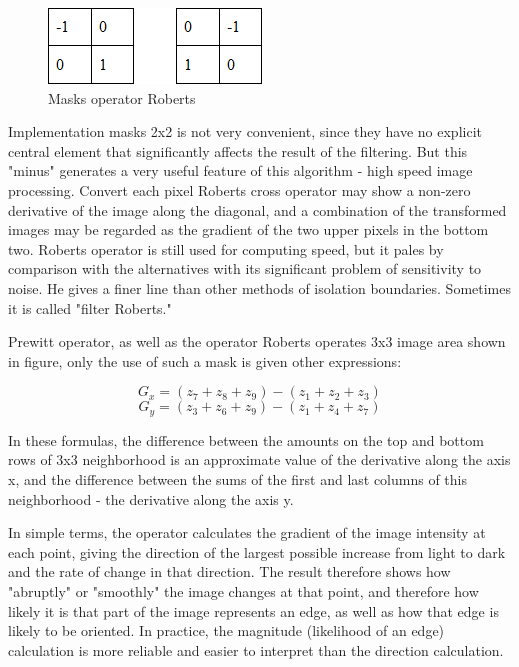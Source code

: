 \begin{figure}[h]
    \centering
    \includegraphics{Figures/masks_operator_roberts}
    \caption{Masks operator Roberts}
    \label{fig:masks_operator_roberts}
\end{figure}

Implementation masks 2x2 is not very convenient, since they have no explicit central element that significantly affects the result of the filtering. But this "minus" generates a very useful feature of this algorithm - high speed image processing. Convert each pixel Roberts cross operator may show a non-zero derivative of the image along the diagonal, and a combination of the transformed images may be regarded as the gradient of the two upper pixels in the bottom two. Roberts operator is still used for computing speed, but it pales by comparison with the alternatives with its significant problem of sensitivity to noise. He gives a finer line than other methods of isolation boundaries. Sometimes it is called "filter Roberts."\cite{Seif}

Prewitt operator, as well as the operator Roberts operates 3x3 image area shown in figure, only the use of such a mask is given other expressions: 

\begin{equation}
    G_x = (z_7 + z_8 + z_9) - (z_1 + z_2 + z_3)
\end{equation}
\begin{equation}
    G_y = (z_3 + z_6 + z_9) - (z_1 + z_4 + z_7)
\end{equation}

In these formulas, the difference between the amounts on the top and bottom rows of 3x3 neighborhood is an approximate value of the derivative along the axis x, and the difference between the sums of the first and last columns of this neighborhood - the derivative along the axis y. 

In simple terms, the operator calculates the gradient of the image intensity at each point, giving the direction of the largest possible increase from light to dark and the rate of change in that direction. The result therefore shows how "abruptly" or "smoothly" the image changes at that point, and therefore how likely it is that part of the image represents an edge, as well as how that edge is likely to be oriented. In practice, the magnitude (likelihood of an edge) calculation is more reliable and easier to interpret than the direction calculation. \cite{Roberts}

